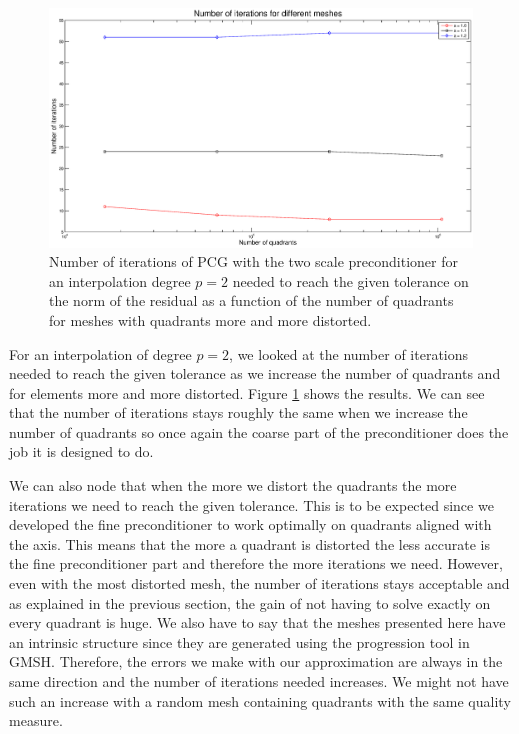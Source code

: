 \begin{figure}
\centering
\includegraphics[scale=0.35]{Results/two_irreg_iter.eps}
\caption{Number of iterations of PCG with the two scale preconditioner for an interpolation degree $p=2$ needed to reach the given tolerance on the norm of the residual as a function of the number of quadrants for meshes with quadrants more and more distorted.}
\label{two_irreg_iter}
\end{figure}

For an interpolation of degree $p=2$, we looked at the number of iterations needed to reach the given tolerance as we increase the number of quadrants and for elements more and more distorted. Figure \ref{two_irreg_iter} shows the results. We can see that the number of iterations stays roughly the same when we increase the number of quadrants so once again the coarse part of the preconditioner does the job it is designed to do. 

We can also node that when the more we distort the quadrants the more iterations we need to reach the given tolerance. This is to be expected since we developed the fine preconditioner to work optimally on quadrants aligned with the axis. This means that the more a quadrant is distorted the less accurate is the fine preconditioner part and therefore the more iterations we need. However, even with the most distorted mesh, the number of iterations stays acceptable and as explained in the previous section, the gain of not having to solve exactly on every quadrant is huge. We also have to say that the meshes presented here have an intrinsic structure since they are generated using the progression tool in GMSH. Therefore, the errors we make with our approximation are always in the same direction and the number of iterations needed increases. We might not have such an increase with a random mesh containing quadrants with the same quality measure. 

